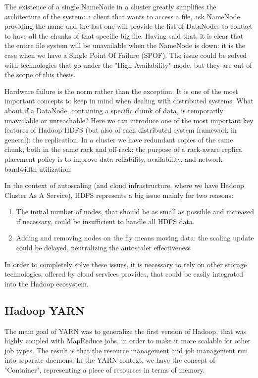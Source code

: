 \documentclass[12pt,twoside,cucitura]{toptesi}
\begin{document}
The existence of a single NameNode in a cluster greatly simplifies the architecture of the system: a client that wants to access a file, ask NameNode providing the name and the last one will provide the list of DataNodes to contact to have all the chunks of that specific big file. Having said that, it is clear that the entire file system will be unavailable when the NameNode is down: it is the case when we have a Single Point Of Failure (SPOF). The issue could be solved with technologies that go under the "High Availability" mode, but they are out of the scope of this thesis. 
 
Hardware failure is the norm rather than the exception. It is one of the most important concepts to keep in mind when dealing with distributed systems. What about if a DataNode, containing a specific chunk of data, is temporarily unavailable or unreachable? Here we can introduce one of the most important key features of Hadoop HDFS (but also of each distributed system framework in general): the replication. In a cluster we have redundant copies of the same chunk, both in the same rack and off-rack: the purpose of a rack-aware replica placement policy is to improve data reliability, availability, and network bandwidth utilization.

In the context of autoscaling (and cloud infrastructure, where we have Hadoop Cluster As A Service), HDFS represents a big issue mainly for two reasons:
\begin{enumerate}
  \item The initial number of nodes, that should be as small as possible and increased if necessary, could be insufficient to handle all HDFS data.
  \item Adding and removing nodes on the fly means moving data: the scaling update could be delayed, neutralizing the autoscaler effectiveness
\end{enumerate}

In order to completely solve these issues, it is necessary to rely on other storage technologies, offered by cloud services provides, that could be easily integrated into the Hadoop ecosystem.
 
\subsection{Hadoop YARN} \label{yarn_intro}
The main goal of YARN \cite{yarn} was to generalize the first version of Hadoop, that was highly coupled with MapReduce jobs, in order to make it more scalable for other job types. The result is that the resource management and job management run into separate daemons. In the YARN context, we have the concept of "Container", representing a piece of resources in terms of memory. 
\end{document}
